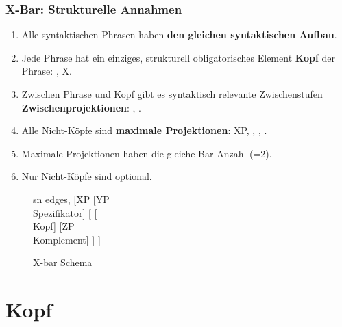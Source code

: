 \begin{frame}
\frametitle{X-Bar: Strukturelle Annahmen}

\begin{multicols}{2}
\begin{enumerate}
	\item Alle syntaktischen Phrasen haben \textbf{den gleichen syntaktischen Aufbau}.
	\item Jede Phrase hat ein einziges, strukturell obligatorisches Element \ras \textbf{Kopf} der Phrase: , X.
	\item Zwischen Phrase und Kopf gibt es syntaktisch relevante Zwischenstufen \ras \textbf{Zwischenprojektionen}: , .
	\item Alle Nicht-Köpfe sind \textbf{maximale Projektionen}: XP, , ,  .
	\item Maximale Projektionen haben die gleiche Bar-Anzahl (=2).
	\item Nur Nicht-Köpfe sind optional.
\end{enumerate}
\end{multicols}

\begin{figure}[b]
	\begin{minipage}[b]{0.05\textwidth}
	\end{minipage} 
	\begin{minipage}[b]{0.50\textwidth}
	\centering
	\tiny{
		\begin{forest}
		sn edges,
		[XP [YP\\Spezifikator]
			[ [\\Kopf]
				[ZP\\Komplement]
			]
		]
		\end{forest}
		}
		\caption{X-bar Schema}	
  	\end{minipage}  
	\begin{minipage}[b]{0.05\textwidth}
  	\end{minipage}
  	
\end{figure}

\end{frame}


\section{Kopf}


